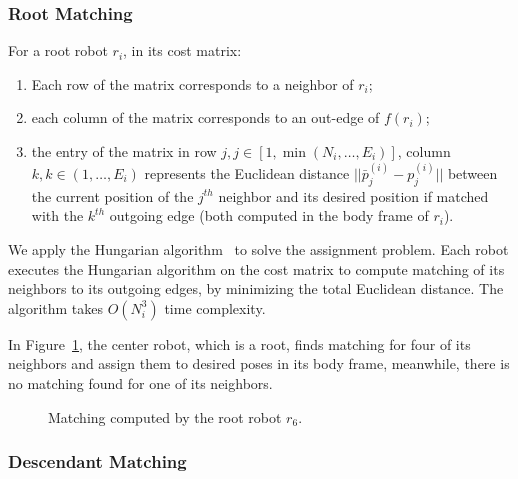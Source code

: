 \subsubsection{Root Matching}

For a root robot $r_i$, in its cost matrix:
\begin{enumerate}
  \item Each row of the matrix corresponds to a neighbor of $r_i$;
  \item each column of the matrix corresponds to an out-edge of $f(r_i)$;
  \item the entry of the matrix in row $j, j \in [1, \min(N_i,\ldots, E_i)]$, column
    $k, k \in (1,\ldots, E_i)$ represents the Euclidean distance $|| \bar{p}_j^{(i)} -
    {p}_j^{(i)} ||$ between the current position of the $j^{th}$ neighbor and
    its desired position if matched with the $k^{th}$ outgoing edge (both computed in the body frame of $r_i$).  
\end{enumerate}

We apply the Hungarian algorithm~\cite{Kuh55} to solve the assignment problem. 
%
Each robot executes the Hungarian algorithm on the cost matrix
to compute matching of its neighbors to its outgoing edges, by minimizing the total Euclidean distance. 
%
The algorithm takes $O(N_i^3)$ time complexity.

%
In Figure~\ref{fig:formsquare}, the center robot, which is a root, finds matching for four of its
neighbors and assign them to desired poses in its body frame, meanwhile, there
is no matching found for one of its neighbors.
\begin{figure}
    \centering
    \begin{minipage}{0.9\textwidth}
    \centering
    
    \end{minipage}
    \caption{Matching computed by the root robot $r_6$.}
    \label{fig:formsquare}
\end{figure}
\begin{figure}
    \centering
    
    \label{fig:formsquare-auth}
\end{figure}

\subsubsection{Descendant Matching}


